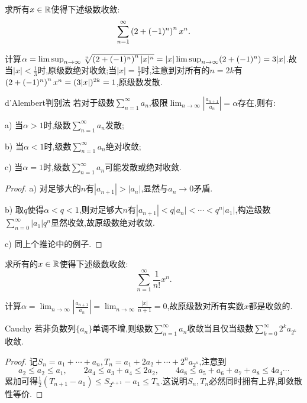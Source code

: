 \begin{example}
	求所有$x \in \mathbb{R}$使得下述级数收敛:$$\sum_{n=1}^{\infty} \left( 2+(-1)^n \right)^n x^n.$$
\end{example}
\begin{solution}
	计算$\alpha = \limsup_{n\to \infty} \sqrt[n]{\left( 2+(-1)^n \right)^n |x|^n}= |x|\limsup_{n\to \infty} (2+(-1)^n)=3|x|$.故当$|x|<\frac{1}{3}$时,原级数绝对收敛;当$|x|=\frac{1}{3}$时,注意到对所有的$n=2k$有$\left( 2+(-1)^n \right)^n x^n = (3|x|)^{2k}=1$,原级数发散.
\end{solution}

\begin{corollary}{d’Alembert判别法}
	若对于级数$\sum_{n=1}^{\infty} a_n$,极限$\lim_{n\to \infty}|\frac{a_{n+1}}{a_n} |=\alpha$存在,则有:
	
	a) 当$\alpha >1$时,级数$\sum_{n=1}^{\infty} a_n$发散;
	
	b) 当$\alpha <1$时,级数$\sum_{n=1}^{\infty} a_n$绝对收敛;
	
	c) 当$\alpha =1$时,级数$\sum_{n=1}^{\infty} a_n$可能发散或绝对收敛.
\end{corollary}
\begin{proof}
	a) 对足够大的$n$有$|a_{n+1}|>|a_n|$,显然与$a_n\to 0$矛盾.
	
	b) 取$q$使得$\alpha < q <1$,则对足够大$n$有$|a_{n+1}|<q|a_n|<\cdots < q^n|a_1|$,构造级数$\sum_{n=0}^{\infty} |a_1|q^n$显然收敛,故原级数绝对收敛.
	
	c) 同上个推论中的例子.
\end{proof}

\begin{example}
	求所有的$x \in \mathbb{R}$使得下述级数收敛:$$\sum_{n=1}^{\infty} \frac{1}{n!}x^n.$$
\end{example}
\begin{solution}
	计算$\alpha = \lim_{n\to \infty}|\frac{a_{n+1}}{a_n} | = \lim_{n\to \infty} \frac{|x|}{n+1} = 0$,故原级数对所有实数$x$都是收敛的.
\end{solution}

\begin{proposition}{Cauchy}
	若非负数列$\{ a_n \}$单调不增,则级数$\sum_{n=1}^{\infty} a_n$收敛当且仅当级数$\sum_{k=0}^{\infty} 2^ka_{2^k}$收敛.
\end{proposition}
\begin{proof}
	记$S_n=a_1+\cdots +a_n,T_n=a_1+2a_2+\cdots +2^na_{2^n}$,注意到$$a_2 \leq a_2 \leq a_1,\qquad 2a_4\leq a_3+a_4 \leq 2a_2,\qquad 4a_8 \leq a_5+a_6+a_7+a_8 \leq 4a_4 \cdots$$
	累加可得$\frac{1}{2}(T_{n+1}-a_1) \leq S_{2^{n+1}}-a_1 \leq T_n$.这说明$S_n,T_n$必然同时拥有上界,即敛散性等价.
\end{proof}

